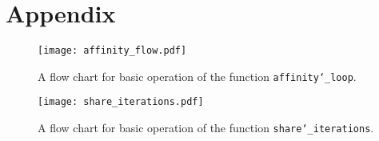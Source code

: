 \documentclass[11pt, a4paper]{article}
\begin{document}
	\section{Appendix} \label{sect:appendix}
	
		\begin{figure}[!h]
			\centering
			\texttt{[image: affinity\_flow.pdf]}
			\caption{A flow chart for basic operation of the function \texttt{affinity\char`_loop}.}
			\label{fig:affinity_loop_flow}
		\end{figure}	
		
		\newpage
		\begin{figure}[]
			\centering
			\texttt{[image: share\_iterations.pdf]}
			\caption{A flow chart for basic operation of the function \texttt{share\char`_iterations}.}
			\label{fig:ashare_iterations_flow}
		\end{figure}	
		
\end{document}
